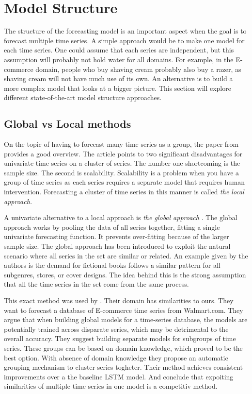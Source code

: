 \section{Model Structure}
\label{section:RelatedWork:Model-structure}
The structure of the forecasting model is an important aspect when the goal is to forecast
multiple time series.
A simple approach would be to make one model for each time series.
One could assume that each series are independent, but this assumption will probably not hold water for all domains.
For example, in the E-commerce domain,
people who buy shaving cream probably also buy a razer, as shaving cream will not have much use of its own.
An alternative is to build a more complex model that looks at a bigger picture.
This section will explore different state-of-the-art model structure approaches.

\subsection{Global vs Local methods}
On the topic of having to forecast many time series as a group, the paper from \cite{Montero-Manso2021} provides a good overview.
The article points to two significant disadvantages for univariate time series on a cluster of series.
The number one shortcoming is the sample size. The second is scalability.
Scalability is a problem when you have a group of time series as each series requires a separate model
that requires human intervention. Forecasting a cluster of time series in this manner is called
\textit{the local approach.}

A univariate alternative to a local approach is \textit{the global approach}
\citep{Rabanser2020}.
The global approach works by pooling the data of all series together, fitting a single univariate forecasting function. It prevents over-fitting because of the larger sample size.
The global approach has been introduced to exploit the natural scenario where all series
in the set are similar or related. An example given by the authors is the demand for fictional
books follows a similar pattern for all subgenres, stores, or cover designs.
The idea behind this is the strong assumption that all the time series in the set
come from the same process.

This exact method was used by \cite{Bandara2017}.
Their domain has similarities to ours. They want to forecast a database of E-commerce time series
from Walmart.com.
They argue that when building global models for a time-series database, the models are
potentially trained across disparate series, which may be detrimental to the overall accuracy.
They suggest building separate models for subgroups of time series.
These groups can be based on domain knowledge, which proved to be the best option. With absence of
domain knowledge they propose an automatic grouping mechanism to cluster series togheter.
Their method achieves consistent improvements over a the baseline LSTM model.
And conclude that expoiting similarities of multiple time series in one model is a competitiv method.

